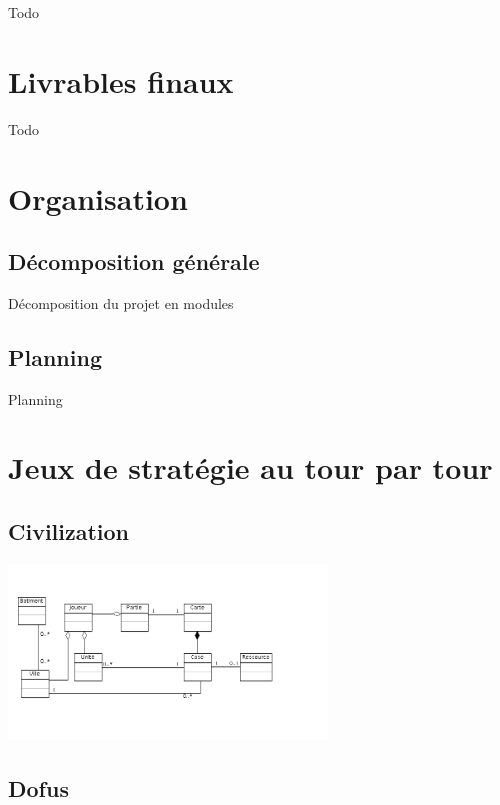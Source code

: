 \documentclass[a4paper,10pt]{report}
\begin{document}
    Todo



  \chapter{Livrables finaux}

    Todo



  \chapter{Organisation}

    \section{Décomposition générale}

      Décomposition du projet en modules


    \section{Planning}

      Planning


\appendix

\chapter{Jeux de stratégie au tour par tour}

	\section{Civilization}

		\includegraphics[width=320px]{diagrammes/concept_civilization.png}


	\section{Dofus}
	
\end{document}

